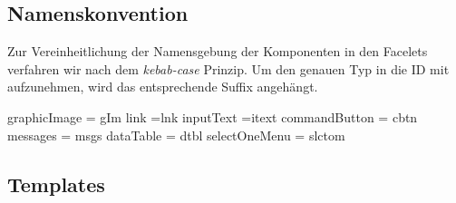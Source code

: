 \newcommand{\ftable}[1]{\begin{sidewaystable}
\begin{tabular}[H]{ |m{1.5cm}| m{1.5cm}| m{3cm}| m{7cm} |m{4cm}| m{4cm}| }
    \toprule
    \textbf{ID} & \textbf{Typ} & \textbf{Beschreibung} & \textbf{Binding} & \textbf{Constraints} & \textbf{Validator \newline Converter} \\
    \midrule
    #1
\end{tabular}
\end{sidewaystable}
}

\newcommand{\fentry}[6]{\footnotesize#1 &\footnotesize#2 &\footnotesize#3 &\footnotesize#4 &\footnotesize#5 &\footnotesize#6\\\hline}


\subsection{Namenskonvention}

Zur Vereinheitlichung der Namensgebung der Komponenten in den Facelets verfahren wir nach dem \emph{kebab-case} Prinzip. Um den genauen Typ in die ID mit aufzunehmen, wird das entsprechende Suffix angehängt.

 graphicImage = gIm link =lnk inputText =itext commandButton = cbtn messages = msgs dataTable = dtbl selectOneMenu = slctom

\subsection{Templates}

